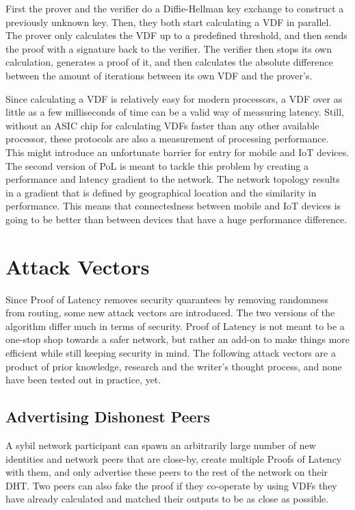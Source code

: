 First the prover and the verifier do a Diffie-Hellman key exchange to construct a previously unknown key. Then, they both start calculating a VDF in parallel. The prover only calculates the VDF up to a predefined threshold, and then sends the proof with a signature back to the verifier. The verifier then stops its own calculation, generates a proof of it, and then calculates the absolute difference between the amount of iterations between its own VDF and the prover's.

Since calculating a VDF is relatively easy for modern processors, a VDF over as little as a few milliseconds of time can be a valid way of measuring latency. Still, without an ASIC chip for calculating VDFs faster than any other available processor, these protocols are also a measurement of processing performance. This might introduce an unfortunate barrier for entry for mobile and IoT devices. The second version of PoL is meant to tackle this problem by creating a performance and latency gradient to the network. The network topology results in a gradient that is defined by geographical location and the similarity in performance. This means that connectedness between mobile and IoT devices is going to be better than between devices that have a huge performance difference.

\section{Attack Vectors}
Since Proof of Latency removes security quarantees by removing randomness from routing, some new attack vectors are introduced. The two versions of the algorithm differ much in terms of security. Proof of Latency is not meant to be a one-stop shop towards a safer network, but rather an add-on to make things more efficient while still keeping security in mind. The following attack vectors are a product of prior knowledge, research and the writer's thought process, and none have been tested out in practice, yet.

\subsection{Advertising Dishonest Peers}
A sybil network participant can spawn an arbitrarily large number of new identities and network peers that are close-by, create multiple Proofs of Latency with them, and only advertise these peers to the rest of the network on their DHT. Two peers can also fake the proof if they co-operate by using VDFs they have already calculated and matched their outputs to be as close as possible. 

